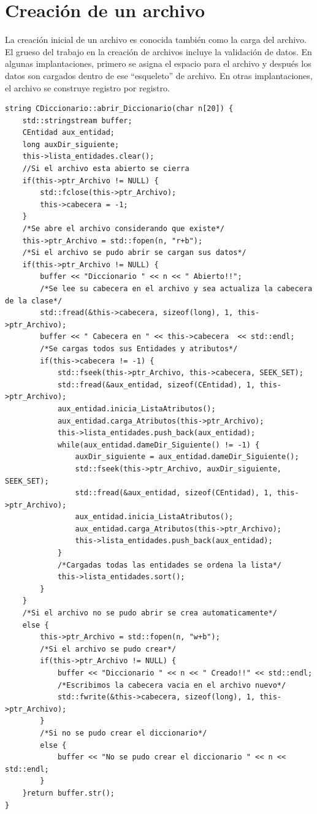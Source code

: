 \section{Creación de un archivo}

La creación inicial de un archivo es conocida también como la carga del archivo.
El grueso del trabajo en la creación de archivos incluye la validación de datos. En algunas implantaciones, primero se asigna el espacio para el archivo y después los datos son cargados dentro de ese “esqueleto” de archivo. En otras implantaciones, el archivo se construye registro por registro.

\newpage
{}
\begin{lstlisting}[frame=single]
string CDiccionario::abrir_Diccionario(char n[20]) {
    std::stringstream buffer;
    CEntidad aux_entidad;
    long auxDir_siguiente;
    this->lista_entidades.clear();
    //Si el archivo esta abierto se cierra
    if(this->ptr_Archivo != NULL) {
        std::fclose(this->ptr_Archivo);
        this->cabecera = -1;
    }
    /*Se abre el archivo considerando que existe*/
    this->ptr_Archivo = std::fopen(n, "r+b");
    /*Si el archivo se pudo abrir se cargan sus datos*/
    if(this->ptr_Archivo != NULL) {
        buffer << "Diccionario " << n << " Abierto!!";
        /*Se lee su cabecera en el archivo y sea actualiza la cabecera de la clase*/
        std::fread(&this->cabecera, sizeof(long), 1, this->ptr_Archivo);
        buffer << " Cabecera en " << this->cabecera  << std::endl;
        /*Se cargas todos sus Entidades y atributos*/
        if(this->cabecera != -1) {
            std::fseek(this->ptr_Archivo, this->cabecera, SEEK_SET);
            std::fread(&aux_entidad, sizeof(CEntidad), 1, this->ptr_Archivo);
            aux_entidad.inicia_ListaAtributos();
            aux_entidad.carga_Atributos(this->ptr_Archivo);
            this->lista_entidades.push_back(aux_entidad);
            while(aux_entidad.dameDir_Siguiente() != -1) {
                auxDir_siguiente = aux_entidad.dameDir_Siguiente();
                std::fseek(this->ptr_Archivo, auxDir_siguiente, SEEK_SET);
                std::fread(&aux_entidad, sizeof(CEntidad), 1, this->ptr_Archivo);
                aux_entidad.inicia_ListaAtributos();
                aux_entidad.carga_Atributos(this->ptr_Archivo);
                this->lista_entidades.push_back(aux_entidad);
            }
            /*Cargadas todas las entidades se ordena la lista*/
            this->lista_entidades.sort();
        }
    }
    /*Si el archivo no se pudo abrir se crea automaticamente*/
    else {
        this->ptr_Archivo = std::fopen(n, "w+b");
        /*Si el archivo se pudo crear*/
        if(this->ptr_Archivo != NULL) {
        	buffer << "Diccionario " << n << " Creado!!" << std::endl;
            /*Escribimos la cabecera vacia en el archivo nuevo*/
            std::fwrite(&this->cabecera, sizeof(long), 1, this->ptr_Archivo);
        }
        /*Si no se pudo crear el diccionario*/
        else {
            buffer << "No se pudo crear el diccionario " << n << std::endl;
        }
    }return buffer.str();
}
\end{lstlisting}

